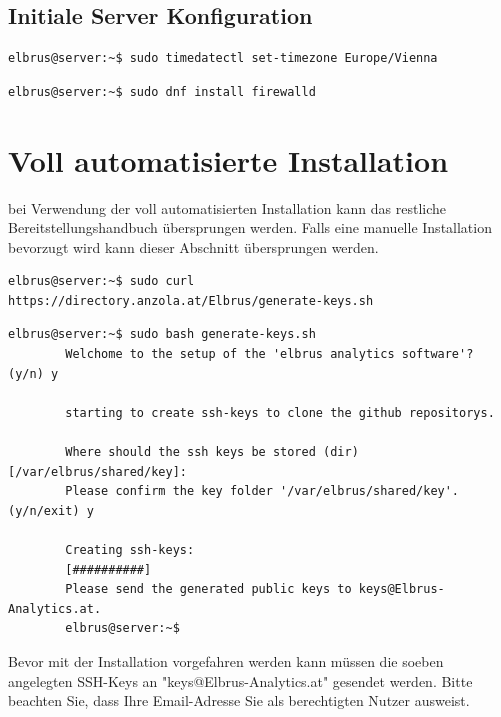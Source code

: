 \documentclass{article}
\begin{document}
	\subsection{Initiale Server Konfiguration}

	\lstset{style=commands}
	\begin{lstlisting}[caption={Setzen der Zeitzone auf 'Europa/Wien'.}]
		elbrus@server:~$ sudo timedatectl set-timezone Europe/Vienna
	\end{lstlisting}

	\lstset{style=commands}
	\begin{lstlisting}[caption={Installieren von dem 'firewalld' Service.}]
		elbrus@server:~$ sudo dnf install firewalld
	\end{lstlisting}
	
	\section{Voll automatisierte Installation}
	bei Verwendung der voll automatisierten Installation kann das restliche Bereitstellungshandbuch übersprungen werden. Falls eine manuelle Installation bevorzugt wird kann dieser Abschnitt übersprungen werden.
	
	\lstset{style=commands}
	\begin{lstlisting}[caption={Installieren des 'generate-keys' Script.}]
		elbrus@server:~$ sudo curl https://directory.anzola.at/Elbrus/generate-keys.sh
	\end{lstlisting}

	\lstset{style=commands}
	\begin{lstlisting}[caption={Ausführen des 'generate-keys' Script.}]
		elbrus@server:~$ sudo bash generate-keys.sh
		Welchome to the setup of the 'elbrus analytics software'? (y/n) y
		
		starting to create ssh-keys to clone the github repositorys.
		
		Where should the ssh keys be stored (dir) [/var/elbrus/shared/key]:
		Please confirm the key folder '/var/elbrus/shared/key'. (y/n/exit) y
		
		Creating ssh-keys:
		[##########]
		Please send the generated public keys to keys@Elbrus-Analytics.at.
		elbrus@server:~$
	\end{lstlisting}
	
	Bevor mit der Installation vorgefahren werden kann müssen die soeben angelegten SSH-Keys an "keys@Elbrus-Analytics.at" gesendet werden. Bitte beachten Sie, dass Ihre Email-Adresse Sie als berechtigten Nutzer ausweist.
	\newpage
	
\end{document}
